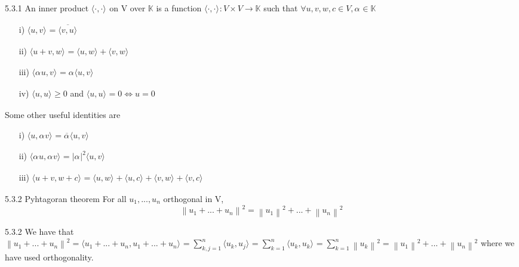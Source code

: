 \documentclass[a4paper,norsk]{article}
\renewcommand{\geq}{\geqslant}
\begin{document}
\begin{definitionbox}{5.3.1}{}
An inner product $ \langle \cdot, \cdot \rangle_{  }  $ on V over $ \mathbb{K}  $  is a function $ \langle \cdot, \cdot \rangle_{  } : V \times V \to \mathbb{K}   $  such that $ \forall u, v, w, c \in V, \alpha_{}^{} \in \mathbb{K}  $ 
\begin{itemize}
  \item[i)] $ \langle u, v \rangle_{  } = \overline{ \langle v, u \rangle_{  } }  $ 
  \item[ii)] $ \langle u+v, w \rangle_{  } = \langle u, w \rangle_{  } + \langle v, w \rangle_{  }  $ 
  \item[iii)] $ \langle \alpha_{}^{} u, v \rangle_{  }  = \alpha_{}^{} \langle u, v \rangle_{  }  $  
  \item[iv)] $ \langle u, u \rangle_{  } \geq 0 $  and $ \langle u, u \rangle_{  } = 0 \iff u = 0 $ 
\end{itemize}


Some other useful identities are

\begin{itemize}
  \item[i)] $ \langle u, \alpha_{}^{} v \rangle_{  }  = \overline{ \alpha_{}^{} } \langle u, v \rangle_{  }  $ 
  \item[ii)] $ \langle \alpha_{}^{} u, \alpha_{}^{} v  \rangle_{  }  = \left| \alpha_{}^{}  \right| ^{2} \langle u, v \rangle_{  }    $  
  \item[iii)] $ \langle u+v, w+c \rangle_{  } = \langle u, w \rangle_{  } + \langle u, c \rangle_{  } + \langle v, w \rangle_{  } + \langle v, c \rangle_{  }  $  
\end{itemize}

\end{definitionbox}


\begin{propositionbox}{5.3.2 Pyhtagoran theorem}{}
For all $ u_1, ..., u_n $ orthogonal in V,
\[
    \left\lVert u_1 + ... + u_n \right\rVert ^{2}  = \left\lVert u_1 \right\rVert ^{2} + ... + \left\lVert u_n \right\rVert ^{2}  
\]

\begin{proofbox}{5.3.2}{}
  We have that $ \left\lVert u_1  + ... + u_n    \right\rVert ^{2}  = \langle u_1 + ... + u_n, u_1 + ... + u_n  \rangle_{  } = \sum_{k,j=1}^{n}  \langle u_k, u_j \rangle_{  } = \sum_{k=1}^{n} \langle u_k, u_k \rangle_{  } = \sum_{k=1}^{n} \left\lVert u_k \right\rVert ^{2} = \left\lVert u_1 \right\rVert ^{2} + ... + \left\lVert u_n \right\rVert ^{2}  $ where we have used orthogonality. 
\end{proofbox}
\end{propositionbox}
\end{document}
